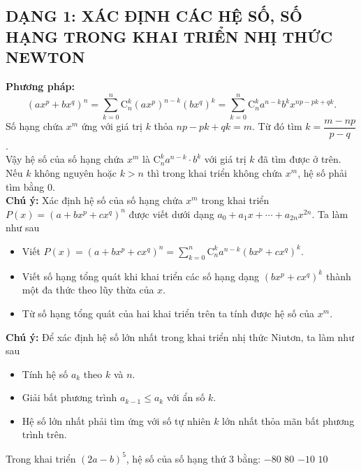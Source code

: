 \subsection{DẠNG 1: XÁC ĐỊNH CÁC HỆ SỐ, SỐ HẠNG TRONG KHAI TRIỂN NHỊ THỨC NEWTON}
\textbf{Phương pháp:}
$$\left(ax^p+bx^q\right)^n=\displaystyle\sum\limits_{k=0}^{n}\mathrm{C}_n^k\left(ax^p\right)^{n-k}\left(bx^q\right)^k=\displaystyle\sum\limits_{k=0}^{n}\mathrm{C}_n^ka^{n-k}b^kx^{np-pk+qk}.$$
Số hạng chứa $x^m$ ứng với giá trị $k$ thỏa $np-pk+qk=m$. Từ đó tìm $k=\dfrac{m-np}{p-q}$.\\
Vậy hệ số của số hạng chứa $x^m$ là $\mathrm{C}_n^ka^{n-k}\cdot b^k$ với giá trị $k$ đã tìm được ở trên.\\
Nếu $k$ không nguyên hoặc $k>n$ thì trong khai triển không chứa $x^m$, hệ số phải tìm bằng $0$.\\
\textbf{Chú ý:} Xác định hệ số của số hạng chứa $x^m$ trong khai triển $P(x)=\left(a+bx^p+cx^q\right)^n$ được viết dưới dạng $a_0+a_1x+\cdots+a_{2n}x^{2n}$. Ta làm như sau
\begin{itemize}
	\item Viết $P(x)=\left(a+bx^p+cx^q\right)^n=\displaystyle\sum\limits_{k=0}^{n}\mathrm{C}_n^ka^{n-k}\left(bx^p+cx^q\right)^k$.
	\item Viết số hạng tổng quát khi khai triển các số hạng dạng $\left(bx^p+cx^q\right)^k$ thành một đa thức theo lũy thừa của $x$.
	\item Từ số hạng tổng quát của hai khai triển trên ta tính được hệ số của $x^m$.
\end{itemize}
\textbf{Chú ý:} Để xác định hệ số lớn nhất trong khai triển nhị thức Niutơn, ta làm như sau
\begin{itemize}
	\item Tính hệ số $a_k$ theo $k$ và $n$.
	\item Giải bất phương trình $a_{k-1}\le a_k$ với ẩn số $k$.
	\item Hệ số lớn nhất phải tìm ứng với số tự nhiên $k$ lớn nhất thỏa mãn bất phương trình trên.
\end{itemize}

\begin{ex}
	Trong khai triển ${\left( {2a - b} \right)^5}$, hệ số của số hạng thứ $3$ bằng:
	\choice
	{$- 80$}
	{\True $80$}
	{$- 10$}
	{$10$}
\end{ex}

